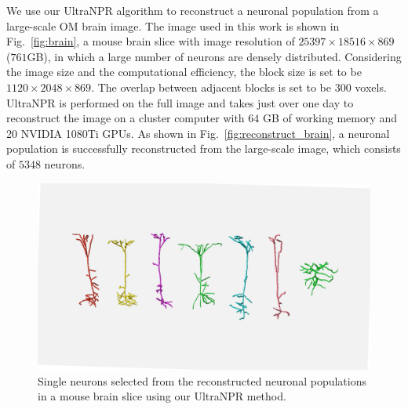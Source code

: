 We use our UltraNPR algorithm to reconstruct a neuronal population from a large-scale OM brain image. 
The image used in this work is shown in Fig.~\ref{fig:brain}, a mouse brain slice with image resolution of $25397\times 18516\times 869$ ($761$GB), in which a large number of neurons are densely distributed. Considering the image size and the computational efficiency, the block size is set to be $1120\times 2048\times 869$.  The overlap between adjacent blocks is set to be $300$ voxels.
%
UltraNPR is performed on the full image and takes just over one day to reconstruct the image on a cluster computer with $64$ GB of working memory and 20 NVIDIA 1080Ti GPUs.
As shown in Fig.~\ref{fig:reconstruct_brain}, a neuronal population is successfully reconstructed from the large-scale image, which consists of $5348$ neurons.
\begin{figure}[t]
	\centering
	\includegraphics[width=1\columnwidth]{./Illustrations/single_neurons4.pdf}
	\caption{Single neurons selected from the reconstructed neuronal populations in a mouse brain slice using our UltraNPR method.}
	\label{fig:single_neurons}
\end{figure}

